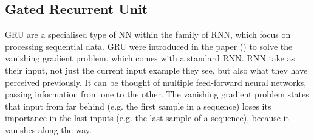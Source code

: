 \subsection{Gated Recurrent Unit}
\label{sub:Gated-Recurrent-Unit}

\gls{GRU} are a specialised type of \gls{NN} within the family of \gls{RNN}, which focus on processing sequential data. \gls{GRU} were introduced in the paper (\cite{cho_learning_2014}) to solve the vanishing gradient problem, which comes with a standard \gls{RNN}. \gls{RNN} take as their input, not just the current input example they see, but also what they have perceived previously. It can be thought of multiple feed-forward neural networks, passing information from one to the other. The vanishing gradient problem states that input from far behind (e.g. the first sample in a sequence) loses its importance in the last inputs (e.g. the last sample of a sequence), because it vanishes along the way.

